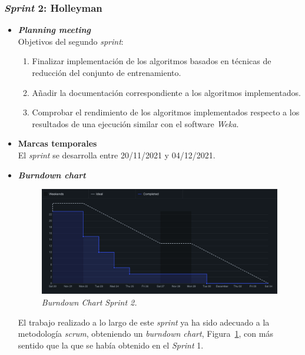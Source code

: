 \subsubsection{\textit{Sprint} 2: Holleyman}
\begin{itemize}
\item \textbf{\textit{Planning meeting}}\\
Objetivos del segundo \textit{sprint}:
\begin{enumerate}
\item Finalizar implementación de los algoritmos basados en técnicas de reducción del conjunto de entrenamiento.
\item Añadir la documentación correspondiente a los algoritmos implementados.
\item Comprobar el rendimiento de los algoritmos implementados respecto a los resultados de una ejecución similar con el software \textit{Weka}.
\end{enumerate}

\item \textbf{Marcas temporales}\\
El \textit{sprint} se desarrolla entre 20/11/2021 y 04/12/2021.

\item \textbf{\textit{Burndown chart}}\\
\begin{figure}
\begin{center}
\includegraphics[width=\textwidth]{../img/anexos/sprints/BD-Sprint2}
\caption{\textit{Burndown Chart Sprint 2.}}\label{fig:BD-Sprint2}
\end{center}
\end{figure}
El trabajo realizado a lo largo de este \textit{sprint} ya ha sido adecuado a la metodología \textit{scrum}, obteniendo un \textit{burndown chart}, Figura~\ref{fig:BD-Sprint2}, con más sentido que la que se había obtenido en el \textit{Sprint } 1. 


\end{itemize}
